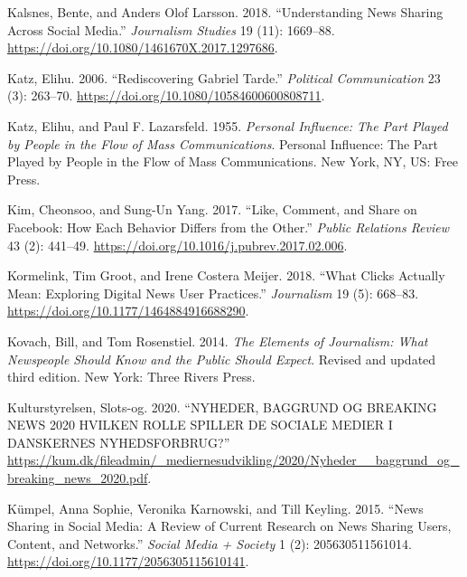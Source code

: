 \documentclass[
]{article}
\newlength{\cslhangindent}
\newlength{\cslentryspacingunit} %
\newenvironment{CSLReferences}[2] %
 {%
  \setlength{\parindent}{0pt}
  \ifodd #1
  \let\oldpar\par
  \def\par{\hangindent=\cslhangindent\oldpar}
  \fi
  \setlength{\parskip}{#2\cslentryspacingunit}
 }%
 {}
\begin{document}
\begin{CSLReferences}{1}{0}
\leavevmode{}%
Kalsnes, Bente, and Anders Olof Larsson. 2018. {``Understanding {News}
{Sharing} {Across} {Social} {Media}.''} \emph{Journalism Studies} 19
(11): 1669--88. \url{https://doi.org/10.1080/1461670X.2017.1297686}.

\leavevmode{}%
Katz, Elihu. 2006. {``Rediscovering {Gabriel} {Tarde}.''}
\emph{Political Communication} 23 (3): 263--70.
\url{https://doi.org/10.1080/10584600600808711}.

\leavevmode{}%
Katz, Elihu, and Paul F. Lazarsfeld. 1955. \emph{Personal Influence: The
Part Played by People in the Flow of Mass Communications}. Personal
Influence: The Part Played by People in the Flow of Mass Communications.
New York, NY, US: Free Press.

\leavevmode{}%
Kim, Cheonsoo, and Sung-Un Yang. 2017. {``Like, Comment, and Share on
{Facebook}: {How} Each Behavior Differs from the Other.''} \emph{Public
Relations Review} 43 (2): 441--49.
\url{https://doi.org/10.1016/j.pubrev.2017.02.006}.

\leavevmode{}%
Kormelink, Tim Groot, and Irene Costera Meijer. 2018. {``What Clicks
Actually Mean: {Exploring} Digital News User Practices.''}
\emph{Journalism} 19 (5): 668--83.
\url{https://doi.org/10.1177/1464884916688290}.

\leavevmode{}%
Kovach, Bill, and Tom Rosenstiel. 2014. \emph{The Elements of
Journalism: What Newspeople Should Know and the Public Should Expect}.
Revised and updated third edition. New York: Three Rivers Press.

\leavevmode{}%
Kulturstyrelsen, Slots-og. 2020. {``{NYHEDER}, {BAGGRUND} {OG}
{BREAKING} {NEWS} 2020 {HVILKEN} {ROLLE} {SPILLER} {DE} {SOCIALE}
{MEDIER} {I} {DANSKERNES} {NYHEDSFORBRUG}?''}
\url{https://kum.dk/fileadmin/_mediernesudvikling/2020/Nyheder__baggrund_og_breaking_news_2020.pdf}.

\leavevmode{}%
Kümpel, Anna Sophie, Veronika Karnowski, and Till Keyling. 2015. {``News
{Sharing} in {Social} {Media}: {A} {Review} of {Current} {Research} on
{News} {Sharing} {Users}, {Content}, and {Networks}.''} \emph{Social
Media + Society} 1 (2): 205630511561014.
\url{https://doi.org/10.1177/2056305115610141}.


\end{CSLReferences}
\end{document}
